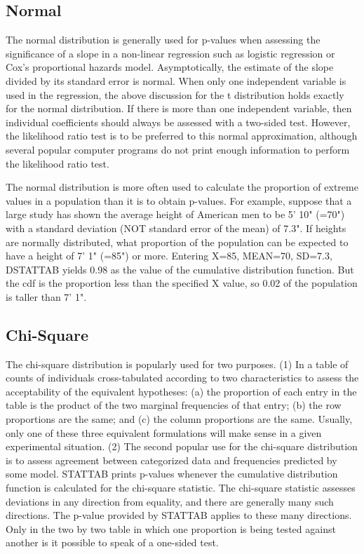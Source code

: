 \documentclass[12pt,dvips]{article}
\newcommand{\mysubsection}[1]
    {\color{green}\subsection{#1}\color{black}}
\begin{document}
\mysubsection{Normal}
     
     
     The normal distribution is generally used for  p-values when assessing
     the  significance of  a  slope in   a  non-linear  regression  such as
     logistic     regression   or     Cox's  proportional  hazards   model.
     Asymptotically, the estimate of  the slope  divided by   its  standard
     error is normal.  When  only one independent  variable is used  in the
     regression, the above discussion for the t distribution  holds exactly
     for the normal  distribution.  If there  is more  than one independent
     variable, then individual coefficients  should always be assessed with
     a two-sided   test.   However, the likelihood   ratio test  is   to be
     preferred to   this normal  approximation,  although  several  popular
     computer programs  do  not  print enough information   to perform  the
     likelihood ratio test.
     
     The normal distribution is more often used to calculate the proportion
     of extreme values in a population than it is  to obtain p-values.  For
     example, suppose that a  large study  has shown  the average height of
     American men   to be  5'  10"  (=70")  with  a standard deviation (NOT
     standard  error  of  the mean)  of   7.3".  If  heights  are  normally
     distributed, what proportion of the population can be expected to have
     a height of  7'  1" (=85") or more.   Entering X=85, MEAN=70,  SD=7.3,
     DSTATTAB yields  0.98  as  the value  of  the cumulative  distribution
     function.  But  the cdf is  the  proportion less than the  specified X
     value, so 0.02 of the population is taller than 7' 1".
     
     
\mysubsection{ Chi-Square}
     
     The chi-square  distribution is popularly  used for two purposes.  (1)
     In a  table of counts  of individuals cross-tabulated according to two
     characteristics   to  assess the    acceptability  of  the  equivalent
     hypotheses:  (a) the  proportion of each  entry in  the  table  is the
     product of  the two marginal  frequencies  of that entry;  (b) the row
     proportions are the same; and (c) the column proportions are the same.
     Usually, only  one of these three equivalent   formulations  will make
     sense in a  given experimental situation.  (2)  The second popular use
     for   the  chi-square distribution   is  to assess   agreement between
     categorized data and frequencies  predicted  by  some model.   STATTAB
     prints p-values whenever   the  cumulative distribution  function   is
     calculated for  the chi-square  statistic.   The chi-square  statistic
     assesses  deviations in  any  direction from  equality,  and there are
     generally many such  directions.    The  p-value provided  by  STATTAB
     applies to  these many directions.   Only in the  two by  two table in
     which one proportion is being tested against another is it possible to
     speak of a one-sided test.
     
\end{document}
